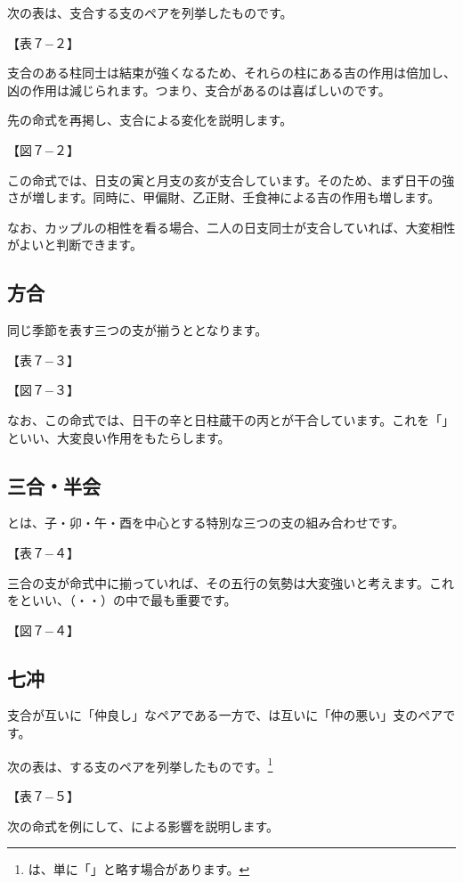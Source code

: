 \documentclass[a5paper,11pt,dvipdfmx]{tarticle}
\begin{document}
次の表は、支合する支のペアを列挙したものです。

【表７−２】

支合のある柱同士は結束が強くなるため、それらの柱にある吉の作用は倍加し、凶の作用は減じられます。つまり、支合があるのは喜ばしいのです。

先の命式を再掲し、支合による変化を説明します。

【図７−２】

この命式では、日支の寅と月支の亥が支合しています。そのため、まず日干の強さが増します。同時に、甲偏財、乙正財、壬食神による吉の作用も増します。

なお、カップルの相性を看る場合、二人の日支同士が支合していれば、大変相性がよいと判断できます。

\subsection{方合}
同じ季節を表す三つの支が揃うととなります。

【表７−３】

【図７−３】

なお、この命式では、日干の辛と日柱蔵干の丙とが干合しています。これを「」といい、大変良い作用をもたらします。

\subsection{三合・半会}
とは、子・卯・午・酉を中心とする特別な三つの支の組み合わせです。

【表７−４】

三合の支が命式中に揃っていれば、その五行の気勢は大変強いと考えます。これをといい、（・・）の中で最も重要です。

【図７−４】

\subsection{七冲}
支合が互いに「仲良し」なペアである一方で、は互いに「仲の悪い」支のペアです。

次の表は、する支のペアを列挙したものです。\footnote{は、単に「」と略す場合があります。}

【表７−５】

次の命式を例にして、による影響を説明します。
\end{document}
